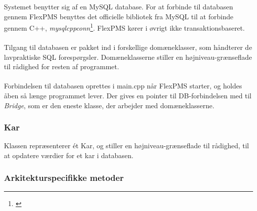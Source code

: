 Systemet benytter sig af en MySQL database. For at forbinde til databasen gennem FlexPMS benyttes det officielle bibliotek fra MySQL til at forbinde gennem C++, \textit{mysqlcppconn}\footnote{\citet{oracle:mysqlcppconn}}. FlexPMS kører i øvrigt ikke transaktionsbaseret.\\\\

Tilgang til databasen er pakket ind i forskellige domæneklasser, som håndterer de lavpraktiske SQL forespørgsler. Domæneklasserne stiller en højniveau-grænseflade til rådighed for resten af programmet.\\\\

Forbindelsen til databasen oprettes i main.cpp når FlexPMS starter, og holdes åben så længe programmet lever. Der gives en pointer til DB-forbindelsen med til \textit{Bridge}, som er den eneste klasse, der arbejder med domæneklasserne.



\subsubsection{Kar}
Klassen repræsenterer ét Kar, og stiller en højniveau-grænseflade til rådighed, til at opdatere værdier for et kar i databasen.

\subsubsection{Arkitekturspecifikke metoder}

{
}

{
}

{
}

{
}


